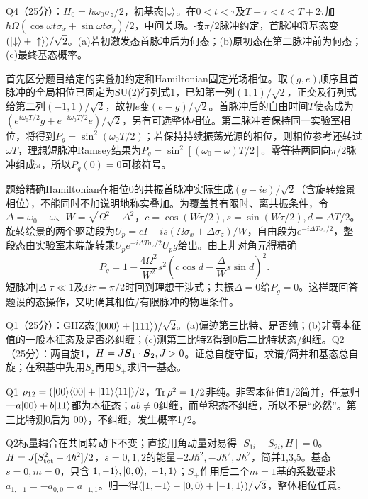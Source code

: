\begin{exercise}
Q4（25分）：$H_0=\hbar\omega_0\sigma_z/2$，初基态$\lvert \downarrow\rangle$。在$0<t<\tau$及$T+\tau<t<T+2\tau$加$\hbar\Omega(\cos\omega t\sigma_x+\sin\omega t\sigma_y)/2$，中间关场。按$\pi/2$脉冲约定，首脉冲将基态变$(\lvert \downarrow\rangle+\lvert \uparrow\rangle)/\sqrt2$。(a)若初激发态首脉冲后为何态；(b)原初态在第二脉冲前为何态；(c)最终基态概率。
\end{exercise}
\begin{solution}
首先区分题目给定的实叠加约定和Hamiltonian固定光场相位。取$(g,e)$顺序且首脉冲的全局相位已固定为SU(2)行列式1，已知第一列$(1,1)/\sqrt2$，正交及行列式给第二列$(-1,1)/\sqrt2$，故初$e$变$(e-g)/\sqrt2$。首脉冲后的自由时间$T$使态成为$(e^{i\omega_0T/2}g+e^{-i\omega_0T/2}e)/\sqrt2$，另有可选整体相位。第二脉冲若保持同一实验室相位，将得到$P_g=\sin^2(\omega_0T/2)$；若保持持续振荡光源的相位，则相位参考还转过$\omega T$，理想短脉冲Ramsey结果为$P_g=\sin^2[(\omega_0-\omega)T/2]$。零等待两同向$\pi/2$脉冲组成$\pi$，所以$P_g(0)=0$可核符号。

题给精确Hamiltonian在相位0的共振首脉冲实际生成$(g-ie)/\sqrt2$（含旋转绘景相位），不能同时不加说明地称实叠加。为覆盖其有限时、离共振条件，令$\Delta=\omega_0-\omega$、$W=\sqrt{\Omega^2+\Delta^2}$，$c=\cos(W\tau/2),s=\sin(W\tau/2),d=\Delta T/2$。旋转绘景的两个驱动段为$U_p=cI-is(\Omega\sigma_x+\Delta\sigma_z)/W$，自由段为$e^{-i\Delta T\sigma_z/2}$，整段态由实验室末端旋转乘$U_pe^{-i\Delta T\sigma_z/2}U_pg$给出。由上非对角元得精确
\[
 P_g=1-\frac{4\Omega^2}{W^2}s^2
 \left(c\cos d-\frac\Delta W s\sin d\right)^2.
\]
短脉冲$|\Delta|\tau\ll1$及$\Omega\tau=\pi/2$时回到理想干涉式；共振$\Delta=0$给$P_g=0$。这样既回答题设的态操作，又明确其相位/有限脉冲的物理条件。
\end{solution}

\begin{exercise}
Q1（25分）：GHZ态$(\lvert 000\rangle+\lvert 111\rangle)/\sqrt2$。(a)偏迹第三比特、是否纯；(b)非零本征值的一般本征态及是否必纠缠；(c)测第三比特Z得到0后二比特状态/纠缠。Q2（25分）：两自旋1，$H=J\boldsymbol{S}_1\cdot\boldsymbol{S}_2,J>0$。证总自旋守恒，求谱/简并和基态总自旋；在积基中先用$S_z$再用$S_+$求归一基态。
\end{exercise}
\begin{solution}
Q1 $\rho_{12}=(\lvert 00\rangle\langle 00\rvert+\lvert 11\rangle\langle 11\rvert)/2$，$\operatorname{Tr}\rho^2=1/2$非纯。非零本征值1/2简并，任意归一$a\lvert 00\rangle+b\lvert 11\rangle$都为本征态；$ab\ne0$纠缠，而单积态不纠缠，所以不是“必然”。第三比特测0后为$\lvert 00\rangle$，不纠缠，发生概率1/2。

Q2标量耦合在共同转动下不变；直接用角动量对易得$[S_{1i}+S_{2i},H]=0$。$H=J[S_{\rm tot}^2-4\hbar^2]/2$，$s=0,1,2$的能量$-2J\hbar^2,-J\hbar^2,J\hbar^2$，简并1,3,5。基态$s=0,m=0$，只含$\lvert 1,-1\rangle,\lvert 0,0\rangle,\lvert -1,1\rangle$；$S_+$作用后二个$m=1$基的系数要求$a_{1,-1}=-a_{0,0}=a_{-1,1}$。归一得$(\lvert 1,-1\rangle-\lvert 0,0\rangle+\lvert -1,1\rangle)/\sqrt3$，整体相位任意。
\end{solution}

